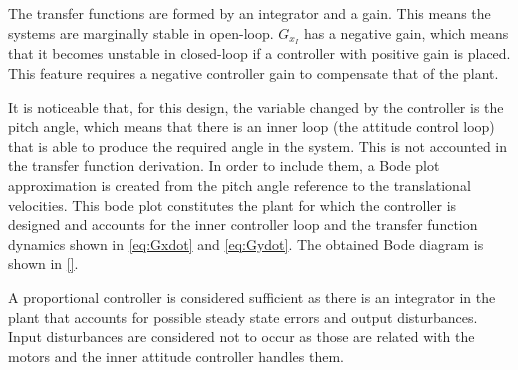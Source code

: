 The transfer functions are formed by an integrator and a gain. This means the systems are marginally stable in open-loop. $G_{x_I}$ has a negative gain, which means that it becomes unstable in closed-loop if a controller with positive gain is placed. This feature requires a negative controller gain to compensate that of the plant.

It is noticeable that, for this design, the variable changed by the controller is the pitch angle, which means that there is an inner loop (the attitude control loop) that is able to produce the required angle in the system. This is not accounted in the transfer function derivation. In order to include them, a Bode plot approximation is created from the pitch angle reference to the translational velocities. This bode plot constitutes the plant for which the controller is designed and accounts for the inner controller loop and the transfer function dynamics shown in \autoref{eq:Gxdot} and \ref{eq:Gydot}.
%
The obtained Bode diagram is shown in \autoref{}.

%
%
%

A proportional controller is considered sufficient as there is an integrator in the plant that accounts for possible steady state errors and output disturbances. Input disturbances are considered not to occur as those are related with the motors and the inner attitude controller handles them.

